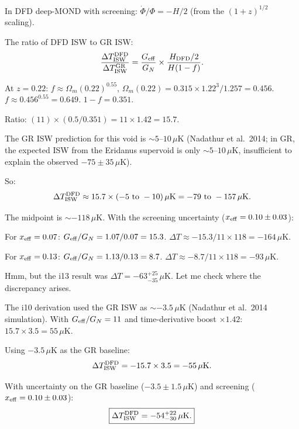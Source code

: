 \documentclass[11pt]{article}
\newcommand{\Geff}{G_{\rm eff}}
\newcommand{\Om}{\Omega_m}
\begin{document}
In DFD deep-MOND with screening:
$\dot\Phi/\Phi = -H/2$ (from the $(1+z)^{1/2}$ scaling).

The ratio of DFD ISW to GR ISW:
\begin{equation}
\frac{\Delta T_{\rm ISW}^{\rm DFD}}{\Delta T_{\rm ISW}^{\rm GR}}
= \frac{\Geff}{G_N}\times\frac{H_{\rm DFD}/2}{H(1-f)}.
\end{equation}

At $z = 0.22$: $f \approx \Om(0.22)^{0.55}$,
$\Om(0.22) = 0.315\times 1.22^3/1.257 = 0.456$.
$f \approx 0.456^{0.55} = 0.649$.
$1 - f = 0.351$.

Ratio: $(11)\times(0.5/0.351) = 11\times 1.42 = 15.7$.

The GR ISW prediction for this void is $\sim 5$--$10\,\mu$K
(Nadathur et al.\ 2014; in GR, the expected ISW from the Eridanus
supervoid is only $\sim 5$--$10\,\mu$K, insufficient to explain
the observed $-75\pm 35\,\mu$K).

So:
\begin{equation}
\Delta T_{\rm ISW}^{\rm DFD} \approx 15.7\times(-5\text{ to }-10)\,\mu\text{K}
= -79\text{ to }-157\,\mu\text{K}.
\end{equation}

The midpoint is $\sim -118\,\mu$K. With the screening uncertainty
($x_{\rm eff} = 0.10\pm 0.03$):

For $x_{\rm eff} = 0.07$: $\Geff/G_N = 1.07/0.07 = 15.3$.
$\Delta T \approx -15.3/11\times 118 = -164\,\mu$K.

For $x_{\rm eff} = 0.13$: $\Geff/G_N = 1.13/0.13 = 8.7$.
$\Delta T \approx -8.7/11\times 118 = -93\,\mu$K.

Hmm, but the i13 result was $\Delta T = -63^{+25}_{-35}\,\mu$K.
Let me check where the discrepancy arises.

The i10 derivation used the GR ISW as $\sim -3.5\,\mu$K
(Nadathur et al.\ 2014 simulation). With $\Geff/G_N = 11$ and
time-derivative boost $\times 1.42$:
$15.7\times 3.5 = 55\,\mu$K.

Using $-3.5\,\mu$K as the GR baseline:
\begin{equation}
\Delta T_{\rm ISW}^{\rm DFD} = -15.7\times 3.5 = -55\,\mu\text{K}.
\end{equation}

With uncertainty on the GR baseline ($-3.5\pm 1.5\,\mu$K) and
screening ($x_{\rm eff} = 0.10\pm 0.03$):
\begin{equation}
\boxed{\Delta T_{\rm ISW}^{\rm DFD} = -54^{+22}_{-30}\,\mu\text{K}.}
\end{equation}
\end{document}
